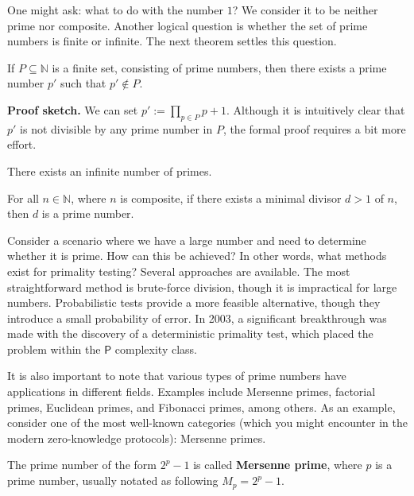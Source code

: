 \documentclass[../../book.tex]{subfiles}
\begin{document}
One might ask: what to do with the number $1$? We consider it to be neither prime 
nor composite. Another logical question is whether the set of prime numbers is finite or infinite.
The next theorem settles this question.

\begin{theorem} 
    If $P \subseteq \mathbb{N}$ is a finite set, consisting of prime numbers, then
    there exists a prime number $p'$ such that $p' \notin P$.
\end{theorem}

\textbf{Proof sketch.} We can set $p' := \prod_{p \in P}p + 1$. Although it is 
intuitively clear that $p'$ is not divisible by any prime number in $P$, the
formal proof requires a bit more effort.

\begin{corollary}
    There exists an infinite number of primes.
\end{corollary}

\begin{lemma}
    For all $n \in \mathbb{N}$, where $n$ is composite, if there exists a 
    minimal divisor $d>1$ of $n$, then $d$ is a prime number.
\end{lemma}

Consider a scenario where we have a large number and need to determine whether
it is prime. How can this be achieved? In other words, what methods exist for
primality testing? Several approaches are available. The most straightforward
method is brute-force division, though it is impractical for large numbers.
Probabilistic tests provide a more feasible alternative, though they introduce a
small probability of error. In 2003, a significant breakthrough was made with
the discovery of a deterministic primality test, which placed the problem within
the $\mathsf{P}$ complexity class.

It is also important to note that various types of prime numbers have
applications in different fields. Examples include Mersenne primes, factorial
primes, Euclidean primes, and Fibonacci primes, among others. As an example,
consider one of the most well-known categories (which you might encounter in the
modern zero-knowledge protocols): Mersenne primes.

\begin{definition}
    The prime number of the form $2^p - 1$ is called \textbf{Mersenne prime}, where $p$ is a
    prime number, usually notated as following $M_p = 2^p - 1$.
\end{definition}
\end{document}
